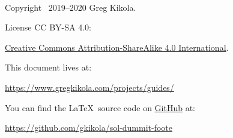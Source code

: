 \ \vspace{30mm}

\noindent Copyright \textcopyright\ 2019--2020 Greg Kikola.

\noindent License CC BY-SA 4.0:
\begin{center}
  \href{http://creativecommons.org/licenses/by-sa/4.0/}{Creative Commons
  Attribution-ShareAlike 4.0 International}.
\end{center}
\vspace{30mm}

\noindent This document lives at:
\begin{center}
  \href{https://www.gregkikola.com/projects/guides/}
  {https://www.gregkikola.com/projects/guides/}
\end{center}
You can find the \LaTeX\ source code on
\href{https://github.com/}{GitHub} at:
\begin{center}
  \href{https://github.com/gkikola/sol-dummit-foote}
  {https://github.com/gkikola/sol-dummit-foote}
\end{center}

